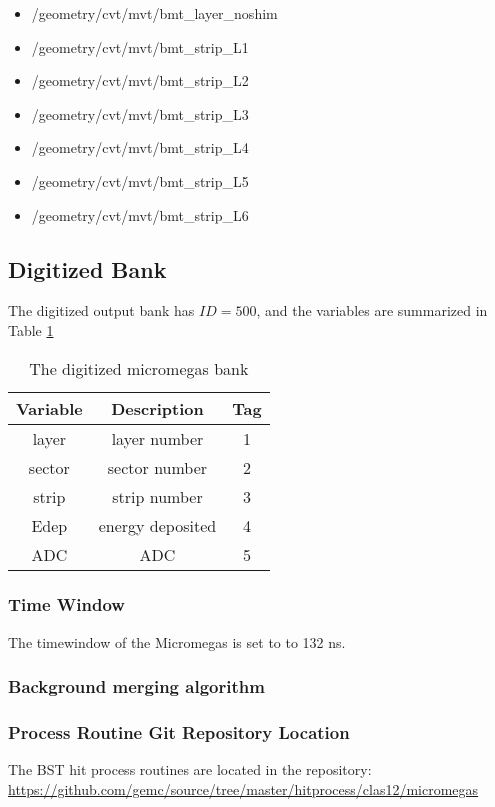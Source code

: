\begin{itemize}
	\item /geometry/cvt/mvt/bmt\_layer\_noshim
	\item /geometry/cvt/mvt/bmt\_strip\_L1
	\item /geometry/cvt/mvt/bmt\_strip\_L2
	\item /geometry/cvt/mvt/bmt\_strip\_L3
	\item /geometry/cvt/mvt/bmt\_strip\_L4
	\item /geometry/cvt/mvt/bmt\_strip\_L5
	\item /geometry/cvt/mvt/bmt\_strip\_L6
\end{itemize}


\subsection{Digitized Bank}
The digitized output bank has $ID=500$, and the variables are summarized in Table \ref{tab:mmBank}

\begin{table}[h]
	\begin{center}
		\begin{tabular}{| c | c | c |}
			\hline \hline
			Variable         & Description  & Tag  \\
			\hline
              layer  &                                      layer number  &    1   \\
             sector  &                                     sector number  &    2   \\
              strip  &                                      strip number  &    3   \\
               Edep  &                                  energy deposited  &    4   \\
                ADC  &                                               ADC  &    5   \\
			\hline \hline
		\end{tabular}
	\end{center}
	\caption{The digitized micromegas bank}\label{tab:mmBank}
\end{table}

\subsubsection{Time Window}
The timewindow of the Micromegas is set to to 132 ns.

\subsubsection{Background merging algorithm}

\subsubsection{Process Routine Git Repository Location}
The BST hit process routines are located in the repository: \url{https://github.com/gemc/source/tree/master/hitprocess/clas12/micromegas}

